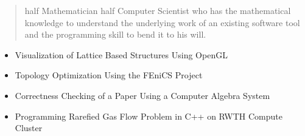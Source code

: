 \documentclass[10pt,a4paper,ragged2e,withhyper]{altacv}
\begin{document}
\begin{paracol}{2}
        
        \newpage
        
        \switchcolumn
        
            \begin{quote}
                half Mathematician half Computer Scientist who has the mathematical knowledge to understand the underlying 
                work of an existing software tool and the programming skill to bend it to his will.
            \end{quote}
        
            \begin{itemize}
                \item Visualization of Lattice Based Structures Using OpenGL
                \item Topology Optimization Using the FEniCS Project 
                \item Correctness Checking of a Paper Using a Computer Algebra System
            \end{itemize}
            \begin{itemize}
                \item Programming Rarefied Gas Flow Problem in C++ on RWTH Compute Cluster
            \end{itemize}
        

\end{paracol}
\end{document}
